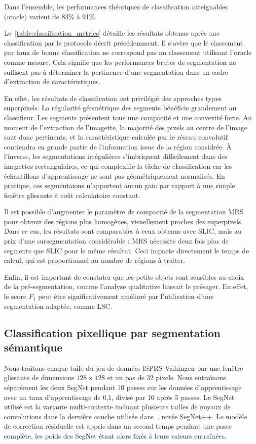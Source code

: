 Dans l'ensemble, les performances théoriques de classification atteignables (oracle) varient de 83\% à 91\%.

Le~\cref{table:classification_metrics} détaille les résultats obtenus après une classification par le protocole décrit précédemment. Il s'avère que le classement par taux de bonne classification ne correspond pas au classement utilisant l'oracle comme mesure. Cela signifie que les performances brutes de segmentation ne suffisent pas à déterminer la pertinence d'une segmentation dans un cadre d'extraction de caractéristiques.

En effet, les résultats de classification ont privilégié des approches types superpixels. La régularité géométrique des segments bénéficie grandement au classifieur. Les segments présentent tous une compacité et une convexité forte. Au moment de l'extraction de l'imagette, la majorité des pixels au centre de l'image sont donc pertinents, et la caractéristique calculée par le réseau convolutif contiendra en grande partie de l'information issue de la région considrée. À l'inverse, les segmentations irrégulières s'imbriquent difficilement dans des imagettes rectangulaires, ce qui complexifie la tâche de classification car les échantillons d'apprentissage ne sont pas géométriquement normalisés. En pratique, ces segmentaions n'apportent aucun gain par rapport à une simple fenêtre glissante à coût calculatoire constant.

Il est possible d'augmenter le paramètre de compacité de la segmentation \gls{MRS} pour obtenir des régions plus homogènes, visuellement proches des superpixels. Dans ce cas, les résultats sont comparables à ceux obtenus avec \gls{SLIC}, mais au prix d'une sursegmentation considérable : \gls{MRS} nécessite deux fois plus de segments que \gls{SLIC} pour le même résultat. Ceci impacte directement le temps de calcul, qui est proportionnel au nombre de régions à traiter.

Enfin, il est important de constater que les petits objets sont sensibles au choix de la pré-segmentation, comme l'analyse qualitative laissait le présager. En effet, le score $F_1$ peut être significativement amélioré par l'utilisation d'une segmentation adaptée, comme \gls{LSC}.

\subsection{Classification pixellique par segmentation sémantique}

Nous traitons chaque tuile du jeu de données ISPRS Vaihingen par une fenêtre glissante de dimensions $128 \times 128$ et un pas de $32$ pixels. Nous entraînons séparément les deux SegNet pendant 10 passes sur les données d'apprentissage avec un taux d'apprentissage de 0,1, divisé par 10 après 5 passes. Le SegNet utilisé est la variante multi-contexte incluant plusieurs tailles de noyaux de convolutions dans la dernière couche utilisée dans~\cite{audebert_semantic_2016}, notée SegNet++. Le modèle de correction résiduelle est appris dans un second temps pendant une passe complète, les poids des SegNet étant alors fixés à leurs valeurs entraînées.

